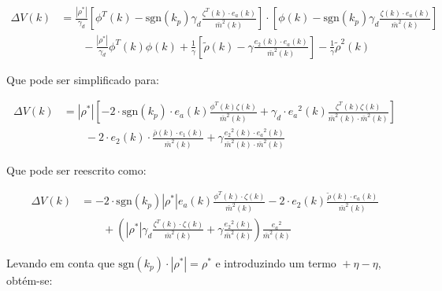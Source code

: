     \begin{equation}
        \begin{split}
            \Delta V(k) &= \frac{|\rho^*|}{\gamma_d} \left[ \phi^T(k) - \mathrm{sgn}(k_p) \gamma_d
                \frac{\zeta^T(k) \cdot e_a(k)}{{\bar{m}}^2(k)} \right] \cdot
                \left[ \phi(k) - \mathrm{sgn}(k_p) \gamma_d \frac{\zeta(k) \cdot e_a(k)}{{\bar{m}}^2(k)} \right] \\
                &\qquad {}- \frac{|\rho^*|}{\gamma_d} \phi^T(k) \phi(k) + \frac{1}{\gamma} \left[ \tilde{\rho}(k)
                - \gamma \frac{e_2(k) \cdot e_a(k)}{{\bar{m}}^2(k)} \right]
                - \frac{1}{\gamma} {\tilde{\rho}}^2(k)
        \end{split}
    \end{equation}

    Que pode ser simplificado para:

    \begin{equation*}
        \begin{split}
            \Delta V(k) &= |\rho^*| \left[ - 2 \cdot \mathrm{sgn}(k_p) \cdot e_a(k) \frac{\phi^T(k) \zeta(k)}{{\bar{m}}^2(k)}
            + \gamma_d \cdot {e_a}^2(k) \frac{\zeta^T(k) \zeta(k)}{{\bar{m}}^2(k) \cdot {\bar{m}}^2(k)} \right] \\
            &\qquad {}- 2 \cdot e_2(k) \cdot \frac{\bar{\rho}(k) \cdot e_1(k)}{{\bar{m}}^2(k)}
            + \gamma \frac{{e_2}^2(k) \cdot {e_a}^2(k)}{{\bar{m}}^2(k) \cdot {\bar{m}}^2(k)}
        \end{split}
    \end{equation*}

    Que pode ser reescrito como:

    \begin{equation*}
        \begin{split}
            \Delta V(k) &= -2 \cdot \mathrm{sgn}(k_p) |\rho^*| e_a(k) \frac{\phi^T(k) \cdot \zeta(k)}{{\bar{m}}^2(k)}
                -2 \cdot e_2(k) \frac{\tilde{\rho}(k) \cdot e_a(k)}{{\bar{m}}^2(k)} \\
                &\qquad {}+ \left( |\rho^*| \gamma_d \frac{\zeta^T(k) \cdot \zeta(k)}{{\bar{m}}^2(k)}
                + \gamma \frac{{e_2}^2(k)}{{\bar{m}}^2(k)} \right) \frac{{e_a}^2}{{\bar{m}}^2(k)}
            \end{split}
    \end{equation*}

    Levando em conta que $\mathrm{sgn}(k_p)\cdot|\rho^*|=\rho^*$ e introduzindo um termo ${}+ \eta - \eta$, obtém-se:

